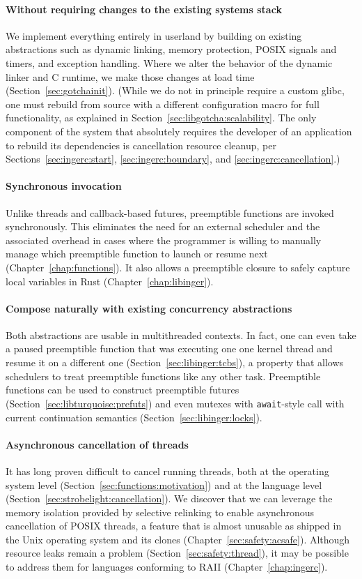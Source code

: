 \paragraph{Without requiring changes to the existing systems stack}
We implement everything entirely in userland by building on existing abstractions
such as dynamic linking, memory protection, POSIX signals and timers, and exception
handling.  Where we alter the behavior of the dynamic linker and C runtime, we make
those changes at load time (Section~\ref{sec:gotchainit}).  (While we do not in
principle require a custom glibc, one must rebuild from source with a different
configuration macro for full functionality, as explained in
Section~\ref{sec:libgotcha:scalability}.  The only component of the system that
absolutely requires the developer of an application to rebuild its dependencies is
cancellation resource cleanup, per Sections~\ref{sec:ingerc:start},
\ref{sec:ingerc:boundary}, and \ref{sec:ingerc:cancellation}.)

\paragraph{Synchronous invocation}
Unlike threads and callback-based futures, preemptible functions are invoked
synchronously.  This eliminates the need for an external scheduler and the associated
overhead in cases where the programmer is willing to manually manage which
preemptible function to launch or resume next (Chapter~\ref{chap:functions}).  It
also allows a preemptible closure to safely capture local variables in Rust
(Chapter~\ref{chap:libinger}).

\paragraph{Compose naturally with existing concurrency abstractions}
Both abstractions are usable in multithreaded contexts.  In fact, one can even take a
paused preemptible function that was executing one one kernel thread and resume it
on a different one (Section~\ref{sec:libinger:tcbs}), a property that allows
schedulers to treat preemptible functions like any other task.  Preemptible functions
can be used to construct preemptible futures (Section~\ref{sec:libturquoise:prefuts})
and even mutexes with \texttt{await}-style call with current continuation semantics
(Section~\ref{sec:libinger:locks}).

\paragraph{Asynchronous cancellation of threads}
It has long proven difficult to cancel running threads, both at the operating system
level (Section~\ref{sec:functions:motivation}) and at the language level
(Section~\ref{sec:strobelight:cancellation}).  We
discover that we can leverage the memory isolation provided by selective relinking to
enable asynchronous cancellation of POSIX threads, a feature that is almost unusable
as shipped in the Unix operating system and its clones
(Chapter~\ref{sec:safety:acsafe}).  Although resource leaks remain a problem
(Section~\ref{sec:safety:thread}), it may be possible to address them for languages
conforming to RAII (Chapter~\ref{chap:ingerc}).

